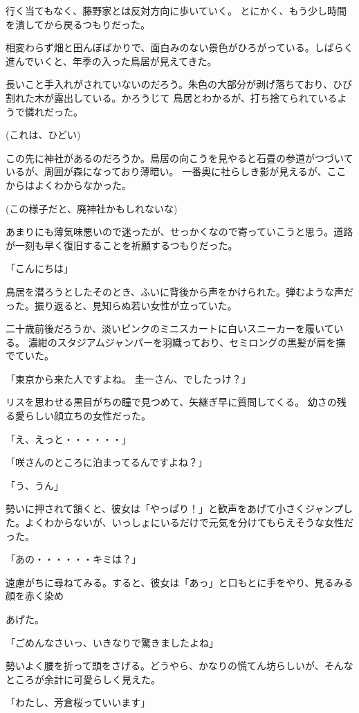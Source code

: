 ﻿\documentclass[book,tate]{jlreq}
\begin{document}
行く当てもなく、藤野家とは反対方向に歩いていく。 とにかく、もう少し時間を潰してから戻るつもりだった。

相変わらず畑と田んぼばかりで、面白みのない景色がひろがっている。しばらく進んでいくと、年季の入った鳥居が見えてきた。

長いこと手入れがされていないのだろう。朱色の大部分が剥げ落ちており、ひび割れた木が露出している。かろうじて 鳥居とわかるが、打ち捨てられているようで憐れだった。

(これは、ひどい)

この先に神社があるのだろうか。鳥居の向こうを見やると石畳の参道がつづいているが、周囲が森になっており薄暗い。 一番奥に社らしき影が見えるが、ここからはよくわからなかった。

(この様子だと、廃神社かもしれないな)

あまりにも薄気味悪いので迷ったが、せっかくなので寄っていこうと思う。道路が一刻も早く復旧することを祈願するつもりだった。

「こんにちは」

鳥居を潜ろうとしたそのとき、ふいに背後から声をかけられた。弾むような声だった。振り返ると、見知らぬ若い女性が立っていた。

二十歳前後だろうか、淡いピンクのミニスカートに白いスニーカーを履いている。 濃紺のスタジアムジャンパーを羽織っており、セミロングの黒髪が肩を撫でていた。

「東京から来た人ですよね。 圭一さん、でしたっけ？」

リスを思わせる黒目がちの瞳で見つめて、矢継ぎ早に質問してくる。 幼さの残る愛らしい顔立ちの女性だった。

「え、えっと・・・・・・」

「咲さんのところに泊まってるんですよね？」

「う、うん」

勢いに押されて頷くと、彼女は「やっぱり！」と歓声をあげて小さくジャンプした。よくわからないが、いっしょにいるだけで元気を分けてもらえそうな女性だった。

「あの・・・・・・キミは？」

遠慮がちに尋ねてみる。すると、彼女は「あっ」と口もとに手をやり、見るみる顔を赤く染め

あげた。

「ごめんなさいっ、いきなりで驚きましたよね」

勢いよく腰を折って頭をさげる。どうやら、かなりの慌てん坊らしいが、そんなところが余計に可愛らしく見えた。

「わたし、芳倉桜っていいます」
\end{document}
